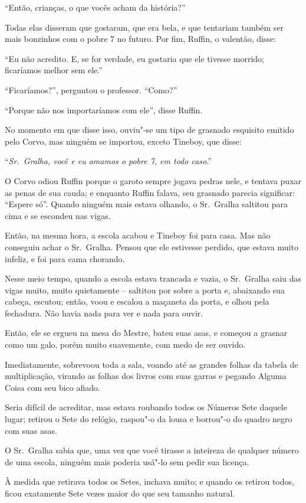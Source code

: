\smallskip
``Então, crianças, o que vocês acham da história?''

Todas elas disseram que gostaram, que era bela, e que tentariam também
ser mais bonzinhos com o pobre 7 no futuro. Por fim, Ruffin, o valentão,
disse:

``Eu não acredito. E, se for verdade, eu gostaria que ele tivesse
morrido; ficaríamos melhor sem ele.''

``Ficaríamos?'', perguntou o professor. ``Como?''

``Porque não nos importaríamos com ele'', disse Ruffin.

No momento em que disse isso, ouviu"-se um tipo de grasnado esquisito
emitido pelo Corvo, mas ninguém se importou, exceto Tineboy, que disse:

``\emph{Sr.~Gralha, você e eu amamos o pobre 7, em todo caso}.''

O Corvo odiou Ruffin porque o garoto sempre jogava pedras nele, e tentava
puxar as penas de sua cauda; e enquanto Ruffin falava, seu grasnado
parecia significar: ``Espere só''. Quando ninguém mais estava olhando, o
Sr.~Gralha saltitou para cima e se escondeu nas vigas.

Então, na mesma hora, a escola acabou e Tineboy foi para casa. Mas
não conseguiu achar o Sr.~Gralha. Pensou que ele estivesse perdido, que
estava muito infeliz, e foi para cama chorando.

Nesse meio tempo, quando a escola estava trancada e vazia, o Sr.~Gralha
saiu das vigas muito, muito quietamente -- saltitou por sobre a porta e,
abaixando sua cabeça, escutou; então, voou e escalou a maçaneta da
porta, e olhou pela fechadura. Não havia nada para ver e nada para
ouvir.

Então, ele se ergueu na mesa do Mestre, bateu suas asas, e começou a
grasnar como um galo, porém muito suavemente, com medo de ser ouvido.

Imediatamente, sobrevoou toda a sala, voando até as grandes folhas da
tabela de multiplicação, virando as folhas dos livros com suas garras e
pegando Alguma Coisa com seu bico afiado.

Seria difícil de acreditar, mas estava roubando todos os Números
Sete daquele lugar; retirou o Sete do relógio, raspou"-o da lousa e
borrou"-o do quadro negro com suas asas.

O Sr.~Gralha sabia que, uma vez que você tirasse a inteireza de qualquer
número de uma escola, ninguém mais poderia usá"-lo sem pedir sua licença.

À medida que retirava todos os Setes, inchava muito; e quando
os retirou todos, ficou exatamente Sete vezes maior do que seu
tamanho natural.

